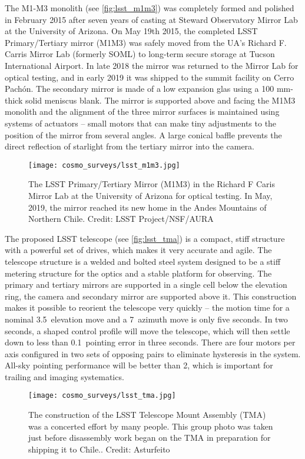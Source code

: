 The M1-M3 monolith (see \autoref{fig:lsst_m1m3}) was completely formed and polished in February 2015 after seven years of casting at Steward Observatory Mirror Lab at the University of Arizona. On May 19th 2015, the completed LSST Primary/Tertiary mirror (M1M3) was safely moved from the UA's Richard F. Carris Mirror Lab (formerly SOML) to long-term secure storage at Tucson International Airport. In late 2018 the mirror was returned to the Mirror Lab for optical testing, and in early 2019 it was shipped to the summit facility on Cerro Pach\'{o}n. The secondary mirror is made of a low expansion glas using a 100 mm-thick solid meniscus blank. The mirror is supported above and facing the M1M3 monolith and the alignment of the three mirror surfaces is maintained using systems of actuators -- small motors that can make tiny adjustments to the position of the mirror from several angles. A large conical baffle prevents the direct reflection of starlight from the tertiary mirror into the camera.
\begin{figure}[ht]
    \centering
    \texttt{[image: cosmo\_surveys/lsst\_m1m3.jpg]}
    \caption{The LSST Primary/Tertiary Mirror (M1M3) in the Richard F Caris Mirror Lab at the University of Arizona for optical testing. In May, 2019, the mirror reached its new home in the Andes Mountains of Northern Chile. Credit: LSST Project/NSF/AURA}
    \label{fig:lsst_m1m3}
\end{figure}

The proposed LSST telescope (see \autoref{fig:lsst_tma}) is a compact, stiff structure with a powerful set of drives, which makes it very accurate and agile. The telescope structure is a welded and bolted steel system designed to be a stiff metering structure for the optics and a stable platform for observing. The primary and tertiary mirrors are supported in a single cell below the elevation ring, the camera and secondary mirror are supported above it. This construction makes it possible to reorient the telescope very quickly -- the motion time for a nominal 3.5\textdegree\ elevation move and a 7\textdegree\ azimuth move is only five seconds. In two seconds, a shaped control profile will move the telescope, which will then settle down to less than 0.1\arcsec\ pointing error in three seconds. There are four motors per axis configured in two sets of opposing pairs to eliminate hysteresis in the system. All-sky pointing performance will be better than 2\arcsec, which is important for trailing and imaging systematics.
\begin{figure}[ht]
    \centering
    \texttt{[image: cosmo\_surveys/lsst\_tma.jpg]}
    \caption{The construction of the LSST Telescope Mount Assembly (TMA) was a concerted effort by many people. This group photo was taken just before disassembly work began on the TMA in preparation for shipping it to Chile.. Credit: Asturfeito}
    \label{fig:lsst_tma}
\end{figure}

